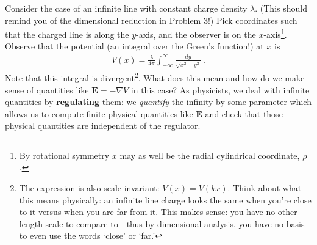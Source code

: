 \documentclass[12pt]{article}
\numberwithin{equation}{subsection}    %
\renewcommand{\vec}[1]{\mathbf{#1}} %
\begin{document}
Consider the case of an infinite line  with constant charge density $\lambda$. (This should remind you of the dimensional reduction in Problem 3!) Pick coordinates such that the charged line is along the $y$-axis, and the observer is on the $x$-axis\footnote{By rotational symmetry $x$ may as well be the radial cylindrical coordinate, $\rho$.}. Observe that the potential (an integral over the Green's function!) at $x$ is
\begin{align}
	V(x) = \frac{\lambda}{4\pi} \int_{-\infty}^\infty \frac{dy}{\sqrt{x^2+y^2}} \ .
	\label{eq:Vx:1d}
\end{align}
Note that this integral is divergent\footnote{The expression is also scale invariant: $V(x) = V(kx)$. Think about what this means physically: an infinite line charge looks the same when you're close to it versus when you are far from it. This makes sense: you have no other length scale to compare to---thus by dimensional analysis, you have no basis to even use the words `close' or `far.'}. What does this mean and how do we make sense of quantities like $\vec E = -\nabla V$ in this case? As physicists, we deal with infinite quantities by \textbf{regulating} them: we \emph{quantify} the infinity by some parameter which allows us to compute finite physical quantities like $\vec E$ and check that those physical quantities are independent of the regulator.
\end{document}

